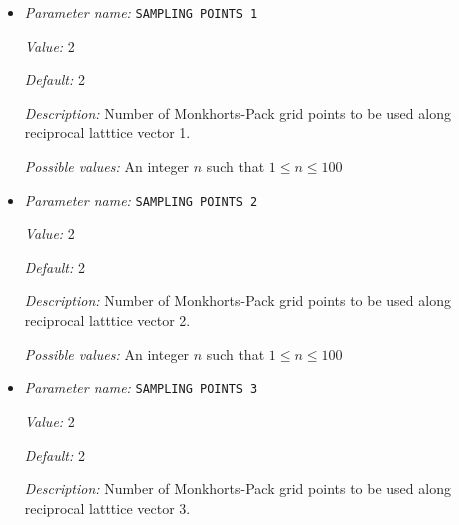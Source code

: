 \begin{itemize}
\item {\it Parameter name:} {\tt SAMPLING POINTS 1}
\label{parameters:Brillouin zone k point sampling options/Monkhorst_2dPack _28MP_29 grid generation/SAMPLING POINTS 1}
\label{parameters:Brillouin_20zone_20k_20point_20sampling_20options/Monkhorst_2dPack_20_28MP_29_20grid_20generation/SAMPLING_20POINTS_201}


{\it Value:} 2


{\it Default:} 2


{\it Description:} Number of Monkhorts-Pack grid points to be used along reciprocal latttice vector 1.


{\it Possible values:} An integer $n$ such that $1\leq n \leq 100$
\item {\it Parameter name:} {\tt SAMPLING POINTS 2}
\label{parameters:Brillouin zone k point sampling options/Monkhorst_2dPack _28MP_29 grid generation/SAMPLING POINTS 2}
\label{parameters:Brillouin_20zone_20k_20point_20sampling_20options/Monkhorst_2dPack_20_28MP_29_20grid_20generation/SAMPLING_20POINTS_202}


{\it Value:} 2


{\it Default:} 2


{\it Description:} Number of Monkhorts-Pack grid points to be used along reciprocal latttice vector 2.


{\it Possible values:} An integer $n$ such that $1\leq n \leq 100$
\item {\it Parameter name:} {\tt SAMPLING POINTS 3}
\label{parameters:Brillouin zone k point sampling options/Monkhorst_2dPack _28MP_29 grid generation/SAMPLING POINTS 3}
\label{parameters:Brillouin_20zone_20k_20point_20sampling_20options/Monkhorst_2dPack_20_28MP_29_20grid_20generation/SAMPLING_20POINTS_203}


{\it Value:} 2


{\it Default:} 2


{\it Description:} Number of Monkhorts-Pack grid points to be used along reciprocal latttice vector 3.



\end{itemize}
